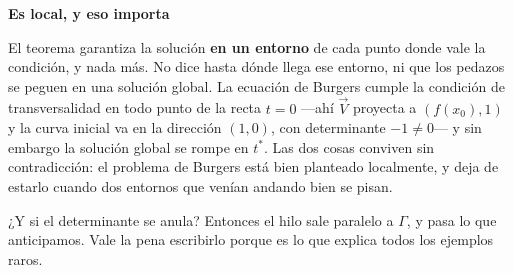 \documentclass[
  spanish,
  a4paper,
]{scrbook}
\theoremstyle{definition}
\theoremstyle{plain}
\theoremstyle{definition}
\theoremstyle{plain}
\theoremstyle{definition}
\theoremstyle{remark}
\begin{document}
\begin{tcolorbox}[enhanced jigsaw, arc=.35mm, bottomrule=.15mm, breakable, colback=white, colframe=quarto-callout-important-color-frame, left=2mm, leftrule=.75mm, opacityback=0, rightrule=.15mm, toprule=.15mm]
\begin{minipage}[t]{5.5mm}
\textcolor{quarto-callout-important-color}{\faExclamation}
\end{minipage}%
\begin{minipage}[t]{\textwidth - 5.5mm}

\vspace{-3mm}\textbf{Es local, y eso importa}\vspace{3mm}

El teorema garantiza la solución \textbf{en un entorno} de cada punto
donde vale la condición, y nada más. No dice hasta dónde llega ese
entorno, ni que los pedazos se peguen en una solución global. La
ecuación de Burgers cumple la condición de transversalidad en todo punto
de la recta \(t=0\) ---ahí \(\vec V\) proyecta a \((f(x_0), 1)\) y la
curva inicial va en la dirección \((1,0)\), con determinante
\(-1 \ne 0\)--- y sin embargo la solución global se rompe en \(t^*\).
Las dos cosas conviven sin contradicción: el problema de Burgers está
bien planteado localmente, y deja de estarlo cuando dos entornos que
venían andando bien se pisan.

\end{minipage}%
\end{tcolorbox}

¿Y si el determinante se anula? Entonces el hilo sale paralelo a
\(\Gamma\), y pasa lo que anticipamos. Vale la pena escribirlo porque es
lo que explica todos los ejemplos raros.
\end{document}
